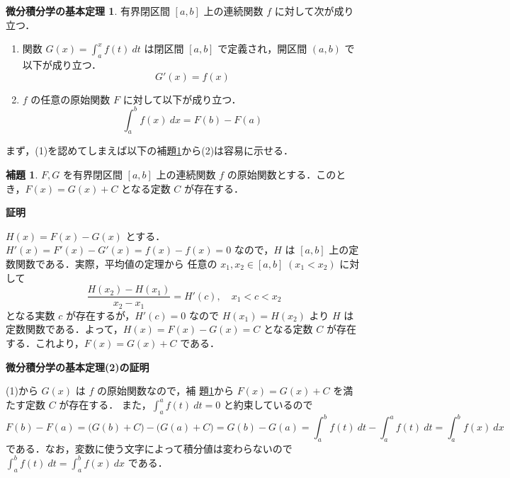 \documentclass[10pt, uplatex, dvipdfmx]{jsarticle}
\makeatletter
\renewenvironment{proof}[1][\proofname]{\par
  \pushQED{\qed}%
  \normalfont \topsep6\p@\@plus6\p@\relax
  \trivlist
  \item\relax
  {\bfseries
  #1\@addpunct{.}}\hspace\labelsep\ignorespaces
}{%
  \popQED\endtrivlist\@endpefalse
}
\theoremstyle{definition}
\newtheorem{lemma}[theorem]{補題}
\renewcommand{\proofname}{\textbf{証明}}
\newtheorem*{fundamental}{\textbf{微分積分学の基本定理}}
\numberwithin{equation}{section}
\newcommand{\ds}{\displaystyle}
\makeatother
\begin{document}
\begin{fundamental}
  有界閉区間 $[a,b]$ 上の連続関数 $f$ に対して次が成り立つ．
  \begin{enumerate}[(1)]
  \item 関数 $\ds G(x) = \int_{a}^{x} f(t)\ dt$ は閉区間 $[a,b]$ で定義され，開区間 $(a,b)$ で以下が成り立つ．
    \[
      G'(x) = f(x)
    \]
    
  \item $f$ の任意の原始関数 $F$ に対して以下が成り立つ．
    \[
      \int_{a}^{b} f(x) \ dx = F(b) - F(a)
    \]
  \end{enumerate}
\end{fundamental}

\vspace{1zh}

まず，(1)を認めてしまえば以下の補題\ref{lem:uptoC}から(2)は容易に示せる．

\begin{lemma}\label{lem:uptoC}
  $F,G$ を有界閉区間 $[a,b]$ 上の連続関数 $f$ の原始関数とする．このと
  き，$F(x) = G(x) +C$ となる定数 $C$ が存在する．
\end{lemma}

\begin{proof}
  $H(x) = F(x) - G(x)$ とする．$H'(x) = F'(x) - G'(x) = f(x) - f(x) =
  0$ なので，$H$ は $[a,b]$ 上の定数関数である．実際，平均値の定理から
  任意の $x_1 ,x_2 \in [a,b] \; ( x_1 < x_2)$ に対して
  \[
    \frac{H(x_2) - H(x_1)}{x_2-x_1} = H'(c) , \quad x_1 < c < x_2
  \]
  となる実数 $c$ が存在するが，$H'(c)=0$ なので $H(x_1) =
  H(x_2)$ より $H$ は定数関数である．よって，$H(x) = F(x) - G(x) = C$
  となる定数 $C$ が存在する．これより，$F(x) = G(x) +C$ である．
\end{proof}

\vspace{1zh}

\begin{proof}[微分積分学の基本定理(2)の証明]
  (1)から $G(x)$ は $f$ の原始関数なので，補
  題\ref{lem:uptoC}から $F(x) = G(x) +C$ を満たす定数 $C$ が存在する．
  また，$\ds \int_{a}^{a} f(t) \ dt =0$ と約束しているので
  \[
    F(b) - F(a) = \Big(G(b) +C \Big) - \Big(G(a) +C\Big) = G(b) - G(a)
    = \int_{a}^{b} f(t) \ dt - \int_{a}^{a} f(t) \ dt = \int_{a}^{b} f(x) \ dx
  \]
  である．なお，変数に使う文字によって積分値は変わらないので
  $\ds \int_{a}^{b} f(t) \ dt = \int_{a}^{b} f(x) \ dx$ である．
\end{proof}

\newpage
\end{document}
